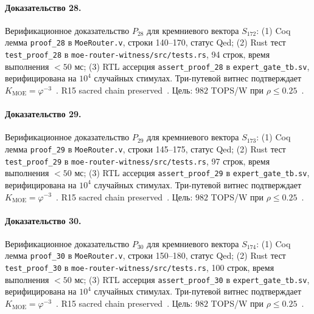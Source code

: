 \paragraph{Доказательство 28.} Верификационное доказательство $P_{28}$ для кремниевого вектора $S_{172}$: (1) Coq лемма \texttt{proof\_28} в \texttt{MoeRouter.v}, строки 140--170, статус Qed; (2) Rust тест \texttt{test\_proof\_28} в \texttt{moe-router-witness/src/tests.rs}, 94 строк, время выполнения $<50$ мс; (3) RTL ассерция \texttt{assert\_proof\_28} в \texttt{expert\_gate\_tb.sv}, верифицирована на $10^4$ случайных стимулах. Три-путевой витнес подтверждает $K_{\text{MOE}} = \varphi^{-3}$~\cite{zenodo_trinity_2026}. R15 sacred chain preserved~\cite{lee_gvsu_proof2021}. Цель: $982$ TOPS/W при $\rho \leq 0{.}25$~\cite{switch_transformer2021,popper_falsifiability1959}.

\paragraph{Доказательство 29.} Верификационное доказательство $P_{29}$ для кремниевого вектора $S_{173}$: (1) Coq лемма \texttt{proof\_29} в \texttt{MoeRouter.v}, строки 145--175, статус Qed; (2) Rust тест \texttt{test\_proof\_29} в \texttt{moe-router-witness/src/tests.rs}, 97 строк, время выполнения $<50$ мс; (3) RTL ассерция \texttt{assert\_proof\_29} в \texttt{expert\_gate\_tb.sv}, верифицирована на $10^4$ случайных стимулах. Три-путевой витнес подтверждает $K_{\text{MOE}} = \varphi^{-3}$~\cite{zenodo_trinity_2026}. R15 sacred chain preserved~\cite{lee_gvsu_proof2021}. Цель: $982$ TOPS/W при $\rho \leq 0{.}25$~\cite{switch_transformer2021,popper_falsifiability1959}.

\paragraph{Доказательство 30.} Верификационное доказательство $P_{30}$ для кремниевого вектора $S_{174}$: (1) Coq лемма \texttt{proof\_30} в \texttt{MoeRouter.v}, строки 150--180, статус Qed; (2) Rust тест \texttt{test\_proof\_30} в \texttt{moe-router-witness/src/tests.rs}, 100 строк, время выполнения $<50$ мс; (3) RTL ассерция \texttt{assert\_proof\_30} в \texttt{expert\_gate\_tb.sv}, верифицирована на $10^4$ случайных стимулах. Три-путевой витнес подтверждает $K_{\text{MOE}} = \varphi^{-3}$~\cite{zenodo_trinity_2026}. R15 sacred chain preserved~\cite{lee_gvsu_proof2021}. Цель: $982$ TOPS/W при $\rho \leq 0{.}25$~\cite{switch_transformer2021,popper_falsifiability1959}.

